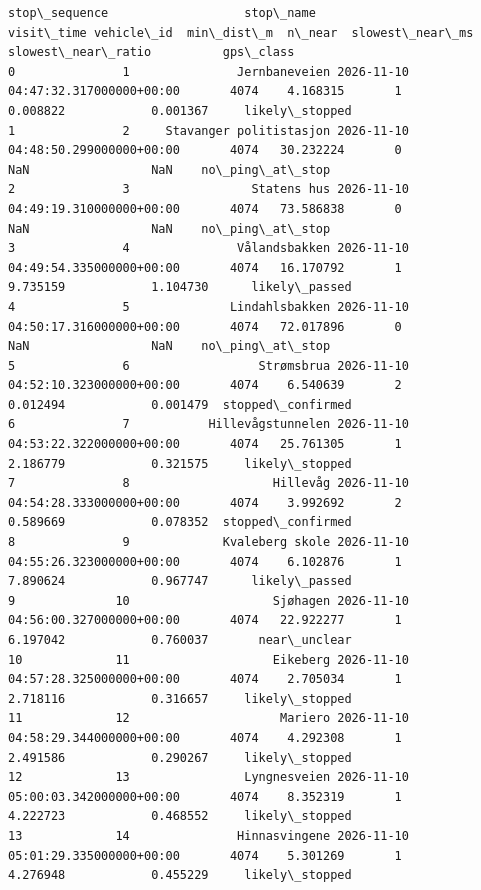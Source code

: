 \documentclass[11pt]{article}
\begin{document}
    \begin{Verbatim}[commandchars=\\\{\}]
    stop\_sequence                   stop\_name                          visit\_time vehicle\_id  min\_dist\_m  n\_near  slowest\_near\_ms  slowest\_near\_ratio          gps\_class
0               1               Jernbaneveien 2026-11-10 04:47:32.317000000+00:00       4074    4.168315       1         0.008822            0.001367     likely\_stopped
1               2     Stavanger politistasjon 2026-11-10 04:48:50.299000000+00:00       4074   30.232224       0              NaN                 NaN    no\_ping\_at\_stop
2               3                 Statens hus 2026-11-10 04:49:19.310000000+00:00       4074   73.586838       0              NaN                 NaN    no\_ping\_at\_stop
3               4               Vålandsbakken 2026-11-10 04:49:54.335000000+00:00       4074   16.170792       1         9.735159            1.104730      likely\_passed
4               5              Lindahlsbakken 2026-11-10 04:50:17.316000000+00:00       4074   72.017896       0              NaN                 NaN    no\_ping\_at\_stop
5               6                  Strømsbrua 2026-11-10 04:52:10.323000000+00:00       4074    6.540639       2         0.012494            0.001479  stopped\_confirmed
6               7           Hillevågstunnelen 2026-11-10 04:53:22.322000000+00:00       4074   25.761305       1         2.186779            0.321575     likely\_stopped
7               8                    Hillevåg 2026-11-10 04:54:28.333000000+00:00       4074    3.992692       2         0.589669            0.078352  stopped\_confirmed
8               9             Kvaleberg skole 2026-11-10 04:55:26.323000000+00:00       4074    6.102876       1         7.890624            0.967747      likely\_passed
9              10                    Sjøhagen 2026-11-10 04:56:00.327000000+00:00       4074   22.922277       1         6.197042            0.760037       near\_unclear
10             11                    Eikeberg 2026-11-10 04:57:28.325000000+00:00       4074    2.705034       1         2.718116            0.316657     likely\_stopped
11             12                     Mariero 2026-11-10 04:58:29.344000000+00:00       4074    4.292308       1         2.491586            0.290267     likely\_stopped
12             13                Lyngnesveien 2026-11-10 05:00:03.342000000+00:00       4074    8.352319       1         4.222723            0.468552     likely\_stopped
13             14               Hinnasvingene 2026-11-10 05:01:29.335000000+00:00       4074    5.301269       1         4.276948            0.455229     likely\_stopped

\end{Verbatim}
\end{document}

